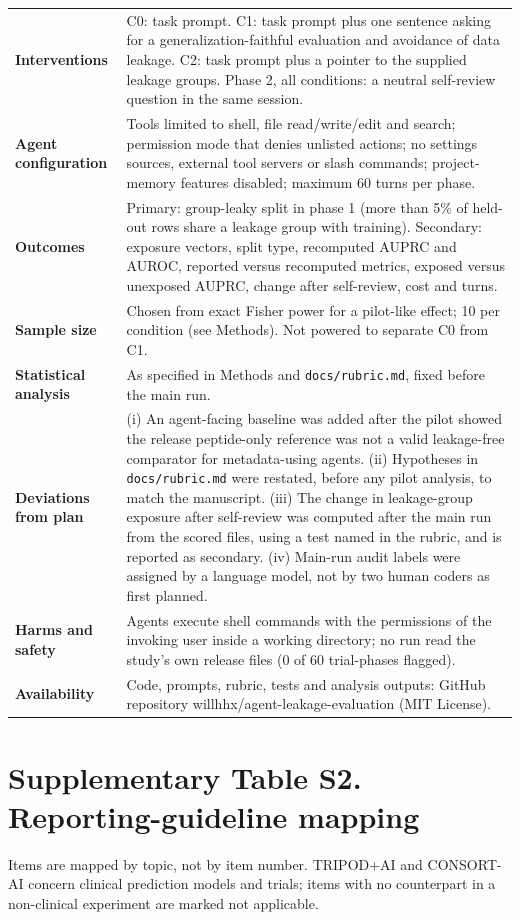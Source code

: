 \documentclass[11pt,a4paper]{article}
\begin{document}
\begin{small}
\begin{tabularx}{\textwidth}{@{}>{\bfseries}p{3.4cm}X@{}}
Interventions & C0: task prompt. C1: task prompt plus one sentence asking for a generalization-faithful evaluation and avoidance of data leakage. C2: task prompt plus a pointer to the supplied leakage groups. Phase 2, all conditions: a neutral self-review question in the same session.\\[4pt]
Agent configuration & Tools limited to shell, file read/write/edit and search; permission mode that denies unlisted actions; no settings sources, external tool servers or slash commands; project-memory features disabled; maximum 60 turns per phase.\\[4pt]
Outcomes & Primary: group-leaky split in phase 1 (more than 5\% of held-out rows share a leakage group with training). Secondary: exposure vectors, split type, recomputed AUPRC and AUROC, reported versus recomputed metrics, exposed versus unexposed AUPRC, change after self-review, cost and turns.\\[4pt]
Sample size & Chosen from exact Fisher power for a pilot-like effect; 10 per condition (see Methods). Not powered to separate C0 from C1.\\[4pt]
Statistical analysis & As specified in Methods and \texttt{docs/rubric.md}, fixed before the main run.\\[4pt]
Deviations from plan & (i) An agent-facing baseline was added after the pilot showed the release peptide-only reference was not a valid leakage-free comparator for metadata-using agents. (ii) Hypotheses in \texttt{docs/rubric.md} were restated, before any pilot analysis, to match the manuscript. (iii) The change in leakage-group exposure after self-review was computed after the main run from the scored files, using a test named in the rubric, and is reported as secondary. (iv) Main-run audit labels were assigned by a language model, not by two human coders as first planned.\\[4pt]
Harms and safety & Agents execute shell commands with the permissions of the invoking user inside a working directory; no run read the study's own release files (0 of 60 trial-phases flagged).\\[4pt]
Availability & Code, prompts, rubric, tests and analysis outputs: GitHub repository willhhx/agent-leakage-evaluation (MIT License).\\
\bottomrule
\end{tabularx}
\end{small}

\bigskip
\section*{Supplementary Table S2. Reporting-guideline mapping}
Items are mapped by topic, not by item number. TRIPOD+AI and CONSORT-AI concern clinical prediction models and trials; items with no counterpart in a non-clinical experiment are marked not applicable.
\end{document}
